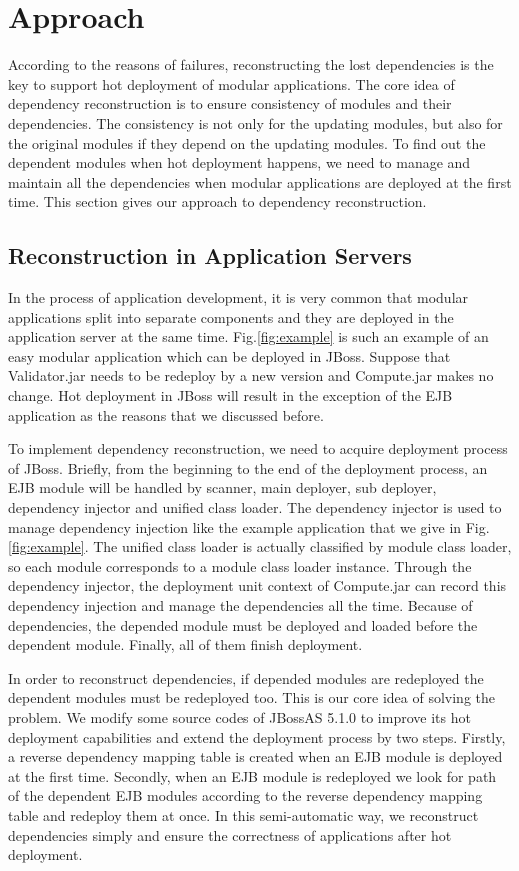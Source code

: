 \documentclass[conference]{IEEEtran}
\begin{document}
\section{Approach\label{sec:approach}}

According to the reasons of failures, reconstructing the lost dependencies is the key to support hot deployment of modular applications.
The core idea of dependency reconstruction is to ensure consistency of modules and their dependencies.
The consistency is not only for the updating modules, but also for the original modules if they depend on the updating modules.
To find out the dependent modules when hot deployment happens, we need to manage and maintain all the dependencies when modular applications are deployed at the first time.
This section gives our approach to dependency reconstruction.

\subsection{Reconstruction in Application Servers}

In the process of application development, it is very common that modular applications split into separate components and they are deployed in the application server at the same time. 
Fig.\ref{fig:example} is such an example of an easy modular application which can be deployed in JBoss. 
Suppose that Validator.jar needs to be redeploy by a new version and Compute.jar makes no change. 
Hot deployment in JBoss will result in the exception of the EJB application as the reasons that we discussed before.

To implement dependency reconstruction, we need to acquire deployment process of JBoss.
Briefly, from the beginning to the end of the deployment process, an EJB module will be handled by scanner, main deployer, sub deployer, dependency injector and unified class loader\cite{deployment_process}.
The dependency injector is used to manage dependency injection like the example application that we give in Fig.\ref{fig:example}.
The unified class loader is actually classified by module class loader, so each module corresponds to a module class loader instance. 
Through the dependency injector, the deployment unit context of Compute.jar can record this dependency injection and manage the dependencies all the time. 
Because of dependencies, the depended module must be deployed and loaded before the dependent module. 
Finally, all of them finish deployment.

In order to reconstruct dependencies, if depended modules are redeployed the dependent modules must be redeployed too. 
This is our core idea of solving the problem. 
We modify some source codes of JBossAS 5.1.0 to improve its hot deployment capabilities and extend the deployment process by two steps. 
Firstly, a reverse dependency mapping table is created when an EJB module is deployed at the first time. 
Secondly, when an EJB module is redeployed we look for path of the dependent EJB modules according to the reverse dependency mapping table and redeploy them at once. 
In this semi-automatic way, we reconstruct dependencies simply and ensure the correctness of applications after hot deployment.
\end{document}

